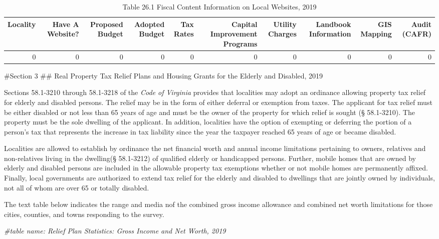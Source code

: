 \documentclass[
]{book}
\newenvironment{Shaded}{\begin{snugshade}}{\end{snugshade}}
\newcommand{\CommentTok}[1]{\textcolor[rgb]{0.56,0.35,0.01}{\textit{#1}}}
\begin{document}
\begin{table}

\caption{\label{tab:unnamed-chunk-3}Table 26.1 Fiscal Content Information on Local Websites, 2019}
\centering
\begin{tabular}[t]{r|r|r|r|r|r|r|r|r|r}
\hline
Locality & Have A Website? & Proposed Budget & Adopted Budget & Tax Rates & Capital Improvement Programs & Utility Charges & Landbook Information & GIS Mapping & Audit (CAFR)\\
\hline
0 & 0 & 0 & 0 & 0 & 0 & 0 & 0 & 0 & 0\\
\hline
\end{tabular}
\end{table}

\#Section 3
\#\# Real Property Tax Relief Plans and Housing Grants for the Elderly and Disabled, 2019

Sections 58.1-3210 through 58.1-3218 of the \emph{Code of Virginia} provides that localities may adopt an ordinance allowing property tax relief for elderly and disabled persons. The relief may be in the form of either deferral or exemption from taxes. The applicant for tax relief must be either disabled or not less than 65 years of age and must be the owner of the property for which relief is sought (§ 58.1-3210). The property must be the sole dwelling of the applicant. In addition, localities have the option of exempting or deferring the portion of a person's tax that represents the increase in tax liability since the year the taxpayer reached 65 years of age or became disabled.

Localities are allowed to establish by ordinance the net financial worth and annual income limitations pertaining to
owners, relatives and non-relatives living in the dwelling(§ 58.1-3212) of qualified elderly or handicapped persons.
Further, mobile homes that are owned by elderly and disabled persons are included in the allowable property tax
exemptions whether or not mobile homes are permanently affixed. Finally, local governments are authorized to extend
tax relief for the elderly and disabled to dwellings that are jointly owned by individuals, not all of whom are over 65
or totally disabled.

The text table below indicates the range and media nof the combined gross income allowance and combined
net worth limitations for those cities, counties, and towns responding to the survey.

\begin{Shaded}
\begin{Highlighting}[]
\CommentTok{\#table name: Relief Plan Statistics: Gross Income and Net Worth, 2019}
\end{Highlighting}
\end{Shaded}
\end{document}
